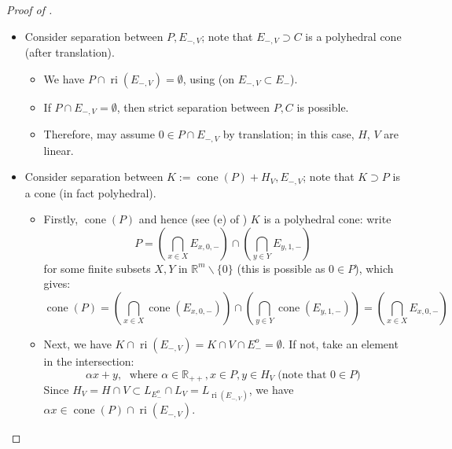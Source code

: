 \begin{proof}[Proof of ]
\begin{itemize}
\[\begin{tikzcd}[column sep=2ex,row sep=2ex]
				      H_C\rar{}\uar{}&C\rar{=}\uar{}&C\uar{}&\lar{}H_{C}\uar{}&\lar{}P_C\uar{}\\
			      \end{tikzcd}
		      \]
		      with the property that for each subgraph $A\to B$, $A\subset B$, and for each subgraph $A\leftarrow B\rightarrow C$, we have $B=A\cap C$. Note that the second and third rows are just the intersection of the first row with $V$ or $C$.
		\item Consider separation between $P,E_{-,V}$; note that $E_{-,V}\supset C$ is a polyhedral cone (after translation).
		      \begin{itemize}
			      \item We have $P\cap \operatorname{ri}(E_{-,V})=\emptyset$, using  (on $E_{-,V}\subset E_{-}$).
			      \item If $P\cap E_{-,V}=\emptyset$, then strict separation between $P,C$ is possible.
			      \item Therefore, may assume $0\in P\cap E_{-,V}$ by translation; in this case, $H$, $V$ are linear.
		      \end{itemize}
		\item Consider separation between $K:=\operatorname{cone}(P)+H_V,E_{-,V}$; note that $K\supset P$ is a cone (in fact polyhedral).
		      \begin{itemize}
			      \item Firstly, $\operatorname{cone}(P)$ and hence (see (e) of ) $K$ is a polyhedral cone: write
			            \[
				            P=\left(\bigcap_{x\in X}E_{x,0,-}\right)\cap\left(\bigcap_{y\in Y}E_{y,1,-}\right)
			            \]
			            for some finite subsets $X,Y$ in $\mathbb{R}^m\smallsetminus \{0\}$ (this is possible as $0\in P$), which gives:
			            \[
				            \operatorname{cone}(P)=\left(\bigcap_{x\in X}\operatorname{cone}(E_{x,0,-})\right)\cap\left(\bigcap_{y\in Y}\operatorname{cone}(E_{y,1,-})\right)
				            =\left(\bigcap_{x\in X}E_{x,0,-}\right)
			            \]
			      \item Next, we have $K\cap \operatorname{ri}(E_{-,V})=K\cap V\cap E_{-}^o=\emptyset$. If not, take an element in the intersection:
			            \[
				            \alpha x+y,\;\text{ where }\alpha \in \mathbb{R}_{++}, x\in P, y\in H_V\;\text{(note that }0\in P\text{)}
			            \]
			            Since $H_V=H\cap V\subset L_{E^o_-}\cap L_{V}=L_{\operatorname{ri}(E_{-,V})}$, we have $\alpha x\in \operatorname{cone}(P) \cap \operatorname{ri}(E_{-,V})$.\\

\end{itemize}
\end{itemize}
\end{proof}

